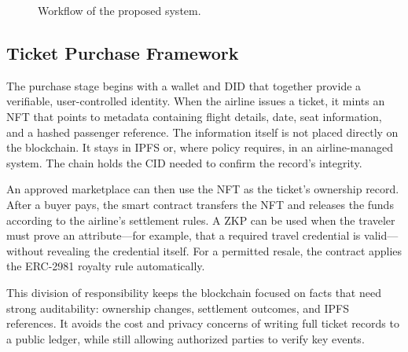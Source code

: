 \documentclass[conference]{IEEEtran}
\begin{document}
\begin{figure}[!t]
\centering
{}
\caption{Workflow of the proposed system.}
\label{fig:workflow}
\end{figure}

\subsection{Ticket Purchase Framework}
The purchase stage begins with a wallet and DID that together provide a verifiable, user-controlled identity. When the airline issues a ticket, it mints an NFT that points to metadata containing flight details, date, seat information, and a hashed passenger reference. The information itself is not placed directly on the blockchain. It stays in IPFS or, where policy requires, in an airline-managed system. The chain holds the CID needed to confirm the record's integrity.

An approved marketplace can then use the NFT as the ticket's ownership record. After a buyer pays, the smart contract transfers the NFT and releases the funds according to the airline's settlement rules. A ZKP can be used when the traveler must prove an attribute---for example, that a required travel credential is valid---without revealing the credential itself. For a permitted resale, the contract applies the ERC-2981 royalty rule automatically.

This division of responsibility keeps the blockchain focused on facts that need strong auditability: ownership changes, settlement outcomes, and IPFS references. It avoids the cost and privacy concerns of writing full ticket records to a public ledger, while still allowing authorized parties to verify key events.
\end{document}
